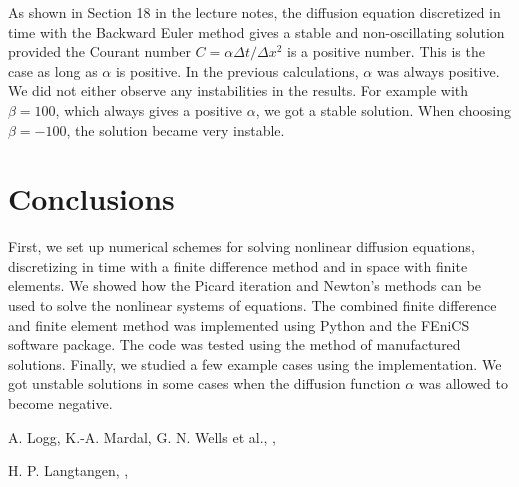 \documentclass[twoside]{article}
\begin{document}
As shown in Section 18 in the lecture notes, the diffusion equation discretized in time with the Backward Euler method gives a stable and non-oscillating solution provided the Courant number $C = \alpha \Delta t/\Delta x^{2}$ is a positive number. This is the case as long as $\alpha $ is positive. In the previous calculations, $\alpha $ was always positive. We did not either observe any instabilities in the results. For example with $\beta = 100$, which always gives a positive $\alpha$, we got a stable solution. When choosing $\beta = -100$, the solution became very instable.  

\section{Conclusions}

First, we set up numerical schemes for solving nonlinear diffusion equations, discretizing in time with a finite difference method and in space with finite elements. We showed how the Picard iteration and Newton's methods can be used to solve the nonlinear systems of equations. The combined finite difference and finite element method was implemented using Python and the FEniCS software package. The code was tested using the method of manufactured solutions. Finally, we studied a few example cases using the implementation. We got unstable solutions in some cases when the diffusion function $\alpha $ was allowed to become negative.  


\printindex

\begin{thebibliography}{1}
    A. Logg, K.-A. Mardal, G. N. Wells et al., \newline
    , \newline

  H. P. Langtangen, \newline
  , \newline

\end{thebibliography}
\end{document}
